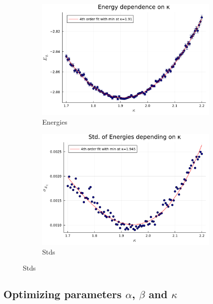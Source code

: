 \documentclass[
	a4paper, %
	10pt, %
]{CSUniSchoolLabReport}
\begin{document}
\begin{figure}[H]
	\begin{subfigure}[b]{0.49\textwidth}
		\centering
		\includegraphics[width=\textwidth]{../saves/task1d.avEnergies.pdf}
		\caption{Energies}
	\end{subfigure}
	\hfill
	\begin{subfigure}[b]{0.49\textwidth}
		\centering
		\includegraphics[width=\textwidth]{../saves/task1d.avStd.pdf}
		\caption{Stds}
	\end{subfigure}
\end{figure}

\subsection{Optimizing parameters $\alpha$, $\beta$ and $\kappa$}
\end{document}
